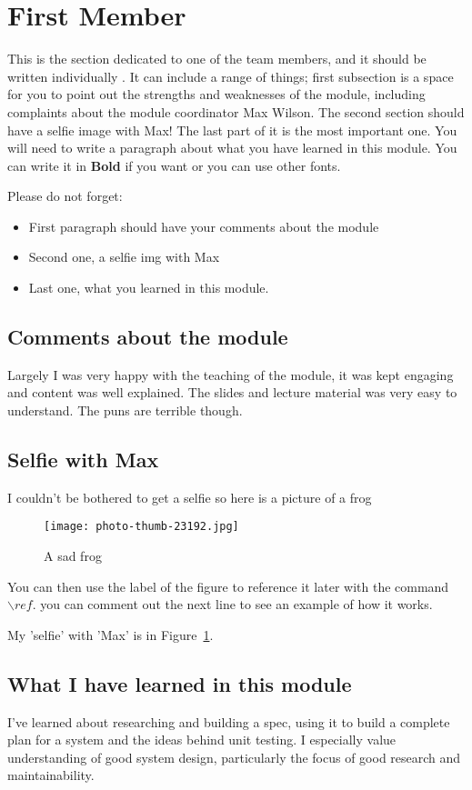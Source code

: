 \section{First Member}
This is the section dedicated to one of the team members, and it should be written individually . It can include a range of things; first subsection is a space for you to point out the strengths and weaknesses of the module, including complaints about the module coordinator Max Wilson. The second section should have a selfie image with Max! The last part of it is the most important one. You will need to write a paragraph about what you have learned in this module. You can write it in \textbf{Bold} if you want or you can use other fonts. 

Please do not forget:
\begin{itemize}
	\item First paragraph should have your comments about the module
	\item Second one, a selfie img with Max
	\item Last one, what you learned in this module.
\end{itemize}

\subsection{Comments about the module}
Largely I was very happy with the teaching of the module, it was kept engaging and content was well explained. The slides and lecture material was very easy to understand. The puns are terrible though.

\subsection{Selfie with Max}

I couldn't be bothered to get a selfie so here is a picture of a frog

\begin{figure}[h]
\caption{A sad frog}
\centering
\texttt{[image: photo-thumb-23192.jpg]}
\label{fig:selfie}
\end{figure}

You can then use the label of the figure to reference it later with the command ${\backslash}ref$. you can comment out the next line to see an example of how it works.

My 'selfie' with 'Max' is in  Figure~\ref{fig:selfie}.

\subsection{What I have learned in this module}
I've learned about researching and building a spec, using it to build a complete plan for a system and the ideas behind unit testing. I especially value understanding of good system design, particularly the focus of good research and maintainability.

